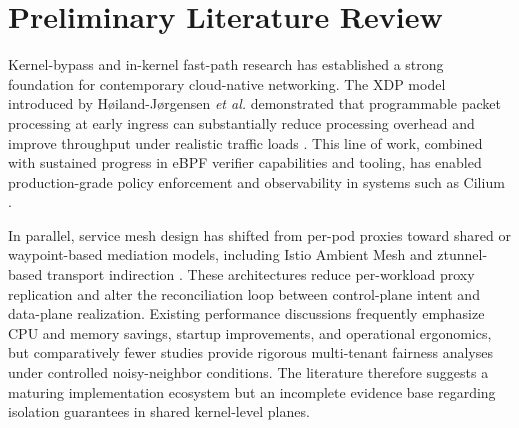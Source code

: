 \section{Preliminary Literature Review}
Kernel-bypass and in-kernel fast-path research has established a strong foundation for contemporary cloud-native networking. The XDP model introduced by H\o iland-J\o rgensen \textit{et al.} demonstrated that programmable packet processing at early ingress can substantially reduce processing overhead and improve throughput under realistic traffic loads \cite{xdp2018}. This line of work, combined with sustained progress in eBPF verifier capabilities and tooling, has enabled production-grade policy enforcement and observability in systems such as Cilium \cite{ciliumArchitecture,ciliumHubble}.

In parallel, service mesh design has shifted from per-pod proxies toward shared or waypoint-based mediation models, including Istio Ambient Mesh and ztunnel-based transport indirection \cite{istioAmbient,ambientDesign}. These architectures reduce per-workload proxy replication and alter the reconciliation loop between control-plane intent and data-plane realization. Existing performance discussions frequently emphasize CPU and memory savings, startup improvements, and operational ergonomics, but comparatively fewer studies provide rigorous multi-tenant fairness analyses under controlled noisy-neighbor conditions. The literature therefore suggests a maturing implementation ecosystem but an incomplete evidence base regarding isolation guarantees in shared kernel-level planes.
